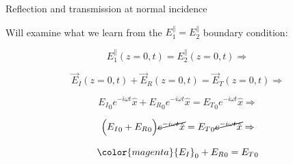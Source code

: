 \begin{frame}{Reflection and transmission at normal incidence}

Will examine what we learn from the $E_1^{\parallel} = E_2^{\parallel}$ boundary condition:

\begin{equation*}
    E_1^{\parallel}(z=0, t) = E_2^{\parallel}(z=0, t) \Rightarrow
\end{equation*}

\begin{equation*}
    \vec{E}_I(z=0, t) + \vec{E}_R(z=0, t)  = \vec{E}_T(z=0, t)  \Rightarrow
\end{equation*}

\begin{equation*}
    {E_I}_0  e^{-i \omega t}  \hat{x} +  {E_R}_0  e^{-i \omega t}  \hat{x} =
    {E_T}_0  e^{-i \omega t}  \hat{x}  \Rightarrow
\end{equation*}

\begin{equation*}
    \Big( {E_I}_0 + {E_R}_0  \Big) \cancel{e^{-i \omega t}  \hat{x}} =
    {E_T}_0  \cancel{e^{-i \omega t}  \hat{x}}  \Rightarrow
\end{equation*}

\begin{equation*}
    {\color{magenta}
       {E_I}_0  +  {E_R}_0  = {E_T}_0
    }
\end{equation*}

\end{frame}

%
%
%

